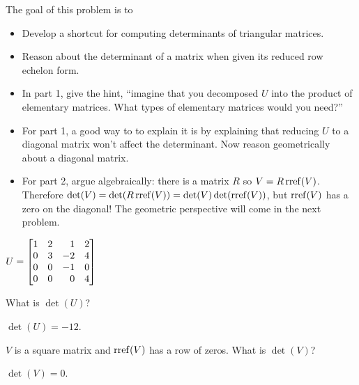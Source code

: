 	\bookonlynewpage
	\question
	\begin{annotation}
		\begin{goals}

			The goal of this problem is to
			\begin{itemize}
				\item Develop a shortcut for computing determinants of triangular matrices.
				\item Reason about the determinant of a matrix when given its reduced
					row echelon form.
			\end{itemize}
		\end{goals}

		\begin{notes}
			\begin{itemize}
				\item In part 1, give the hint, ``imagine that you decomposed
					$U$ into the product of elementary matrices. What types of
					elementary matrices would you need?''
				\item For part 1, a good way to to explain it is by explaining that 
					reducing $U$ to a diagonal matrix won't affect the determinant.
					Now reason geometrically about a diagonal matrix.
				\item For part 2, argue algebraically: there is a matrix $R$ so $V=R\operatorname{rref}(V)$.
					Therefore $\det(V)=\det(R\operatorname{rref}(V))=\det(V)\det(\operatorname{rref}(V))$, but $\operatorname{rref}(V)$
					has a zero on the diagonal! The geometric perspective will come in the next problem.
			\end{itemize}
		\end{notes}
	\end{annotation}
	$U=\mat{1&2&1&2\\0&3&-2&4\\0&0&-1&0\\0&0&0&4}$
	\begin{parts}
		\item What is $\det(U)$?
			\begin{solution}
				$\det(U)=-12$.
			\end{solution}
		\item $V$ is a square matrix and $\operatorname{rref}(V)$ has a row of zeros.
			What is $\det(V)$?
			\begin{solution}
				$\det(V)=0$.
			\end{solution}
	\end{parts}
	
